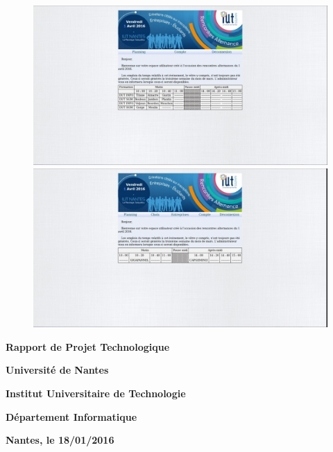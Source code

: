 \documentclass[12pt,a4paper]{article}
\begin{document}
\begin{figure}
  \centering
  \includegraphics[scale=0.4]{figure14(3_2).jpg}
  \includegraphics[scale=0.4]{figure15(3_2).jpg}
\end{figure}

\newpage
\begin{center}\begin{huge}\textbf{Rapport de Projet Technologique}\end{huge}


\vfill

\begin{LARGE}\textbf{Université de Nantes}\end{LARGE}
\bigbreak
\begin{LARGE}\textbf{Institut Universitaire de Technologie}\end{LARGE}
\bigbreak
\begin{LARGE}\textbf{Département Informatique}\end{LARGE}


\vfill

\begin{LARGE}\textbf{Nantes, le 18/01/2016}\end{LARGE}
\end{center}
\end{document}
